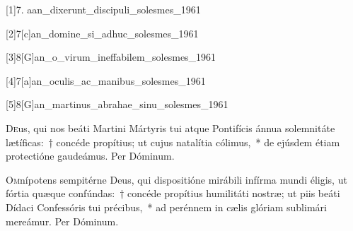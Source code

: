 \documentclass[vesperale_romanum]{subfiles}
\begin{document}

[1]{7. a}{an_dixerunt_discipuli_solesmes_1961}

[2]{7}[c]{an_domine_si_adhuc_solesmes_1961}
\label{110_7c_nov}

[3]{8}[G]{an_o_virum_ineffabilem_solesmes_1961}

[4]{7}[a]{an_oculis_ac_manibus_solesmes_1961}
\label{112_7a_nov}

[5]{8}[G]{an_martinus_abrahae_sinu_solesmes_1961}



\commemoration

\myrule


\semiduplex


\oratio

\lettrine{D}{e}us, qui nos beáti Martini Mártyris tui atque Pontifícis ánnua sole\-mnitáte lætíficas:~† concéde propítius; ut cujus natalítia cólimus,~* de ejúsdem étiam prote\-ctióne gaudeámus. Per Dóminum.

\capitdeseq

\myrule

\newpage


\semiduplex

\oratio

\lettrine{O}{m}nípotens sempitérne Deus, qui dispositióne mirábili infírma mundi éligis, ut fórtia quæque confúndas:~† concéde propítius humilitáti nostræ; ut piis beáti Dídaci Confessóris tui précibus,~* ad perénnem in cælis glóriam sublimári mereámur. Per Dóminum.

\end{document}
